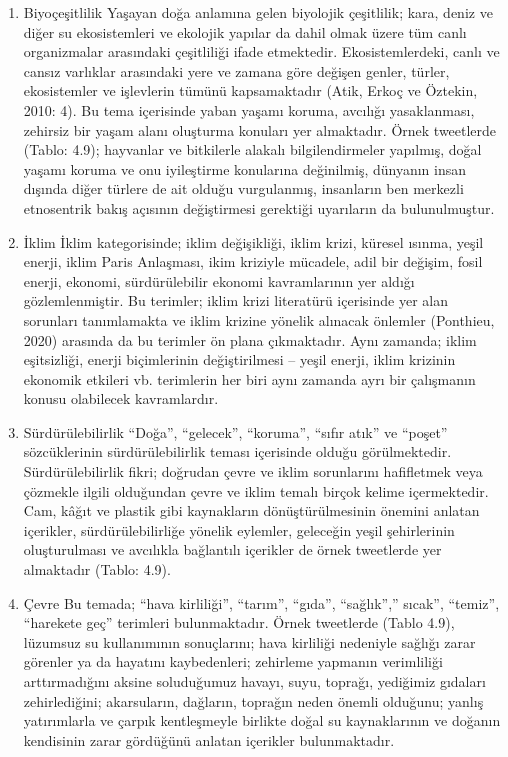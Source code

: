 \documentclass[
]{book}
\begin{document}
\begin{enumerate}
\def\labelenumi{\arabic{enumi})}
\item
  Biyoçeşitlilik
  Yaşayan doğa anlamına gelen biyolojik çeşitlilik; kara, deniz ve diğer su ekosistemleri ve ekolojik yapılar da dahil olmak üzere tüm canlı organizmalar arasındaki çeşitliliği ifade etmektedir. Ekosistemlerdeki, canlı ve cansız varlıklar arasındaki yere ve zamana göre değişen genler, türler, ekosistemler ve işlevlerin tümünü kapsamaktadır (Atik, Erkoç ve Öztekin, 2010: 4). Bu tema içerisinde yaban yaşamı koruma, avcılığı yasaklanması, zehirsiz bir yaşam alanı oluşturma konuları yer almaktadır. Örnek tweetlerde (Tablo: 4.9); hayvanlar ve bitkilerle alakalı bilgilendirmeler yapılmış, doğal yaşamı koruma ve onu iyileştirme konularına değinilmiş, dünyanın insan dışında diğer türlere de ait olduğu vurgulanmış, insanların ben merkezli etnosentrik bakış açısının değiştirmesi gerektiği uyarıların da bulunulmuştur.
\item
  İklim
  İklim kategorisinde; iklim değişikliği, iklim krizi, küresel ısınma, yeşil enerji, iklim Paris Anlaşması, ikim kriziyle mücadele, adil bir değişim, fosil enerji, ekonomi, sürdürülebilir ekonomi kavramlarının yer aldığı gözlemlenmiştir. Bu terimler; iklim krizi literatürü içerisinde yer alan sorunları tanımlamakta ve iklim krizine yönelik alınacak önlemler (Ponthieu, 2020) arasında da bu terimler ön plana çıkmaktadır. Aynı zamanda; iklim eşitsizliği, enerji biçimlerinin değiştirilmesi -- yeşil enerji, iklim krizinin ekonomik etkileri vb. terimlerin her biri aynı zamanda ayrı bir çalışmanın konusu olabilecek kavramlardır.
\item
  Sürdürülebilirlik
  ``Doğa'', ``gelecek'', ``koruma'', ``sıfır atık'' ve ``poşet'' sözcüklerinin sürdürülebilirlik teması içerisinde olduğu görülmektedir. Sürdürülebilirlik fikri; doğrudan çevre ve iklim sorunlarını hafifletmek veya çözmekle ilgili olduğundan çevre ve iklim temalı birçok kelime içermektedir. Cam, kâğıt ve plastik gibi kaynakların dönüştürülmesinin önemini anlatan içerikler, sürdürülebilirliğe yönelik eylemler, geleceğin yeşil şehirlerinin oluşturulması ve avcılıkla bağlantılı içerikler de örnek tweetlerde yer almaktadır (Tablo: 4.9).
\item
  Çevre
  Bu temada; ``hava kirliliği'', ``tarım'', ``gıda'', ``sağlık'','' sıcak'', ``temiz'', ``harekete geç'' terimleri bulunmaktadır. Örnek tweetlerde (Tablo 4.9), lüzumsuz su kullanımının sonuçlarını; hava kirliliği nedeniyle sağlığı zarar görenler ya da hayatını kaybedenleri; zehirleme yapmanın verimliliği arttırmadığını aksine soluduğumuz havayı, suyu, toprağı, yediğimiz gıdaları zehirlediğini; akarsuların, dağların, toprağın neden önemli olduğunu; yanlış yatırımlarla ve çarpık kentleşmeyle birlikte doğal su kaynaklarının ve doğanın kendisinin zarar gördüğünü anlatan içerikler bulunmaktadır.

\end{enumerate}
\end{document}

